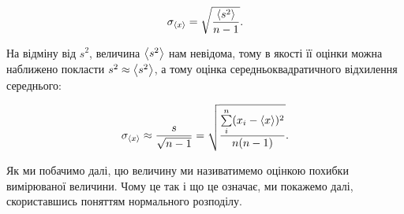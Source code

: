 \documentclass{LabBook}
\begin{document}



\begin{equation}\label{eq:averrorest}
	\sigma_{\left\langle x \right\rangle} = \sqrt{\frac{\left\langle s^2 \right\rangle}{n-1}}.
\end{equation}

На відміну від $s^2$, величина $\left\langle s^2 \right\rangle$ нам невідома, тому в якості її оцінки можна наближено покласти $s^2 \approx \left\langle s^2 \right\rangle$, а тому оцінка середньоквадратичного відхилення середнього:

\begin{equation}\label{eq:averrorest_sim}
	\sigma_{\left\langle x \right\rangle} \approx \frac{s}{\sqrt{n-1}} = \sqrt{\frac{\sum\limits_i^n (x_i - \left\langle x \right\rangle)^2}{n(n - 1)}}.
\end{equation}

Як ми побачимо далі, цю величину ми називатимемо оцінкою похибки вимірюваної величини. Чому це так і що це означає, ми покажемо далі, скориставшись поняттям нормального розподілу.

\end{document}
